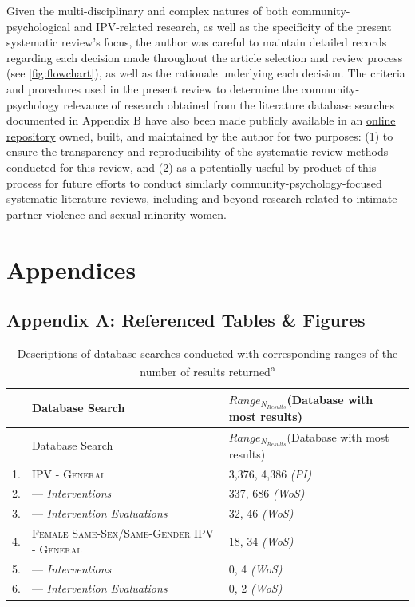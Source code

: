 \documentclass[11pt,]{tufte-book}
\begin{document}
Given the multi-disciplinary and complex natures of both
community-psychological and IPV-related research, as well as the
specificity of the present systematic review's focus, the author was
careful to maintain detailed records regarding each decision made
throughout the article selection and review process (see
\cref{fig:flowchart}), as well as the rationale
underlying each decision. The criteria and procedures used in the
present review to determine the community-psychology relevance of
research obtained from the literature database searches documented in
Appendix B have also been made publicly available in an
\href{https://eccriley.github.io/CommPsy-SysLitRvw/}{online repository}
owned, built, and maintained by the author for two purposes: (1) to
ensure the transparency and reproducibility of the systematic review
methods conducted for this review, and (2) as a potentially useful
by-product of this process for future efforts to conduct similarly
community-psychology-focused systematic literature reviews, including
and beyond research related to intimate partner violence and sexual
minority women.

\part{Appendices}

\singlespacing

\chapter{Appendix A: Referenced Tables \&
Figures}\label{appendix-a-referenced-tables-figures}

\begin{longtable}[]{@{}lll@{}}
\caption{Descriptions of database searches conducted with corresponding
ranges of the number of results returned\textsuperscript{a}
\label{tbl:dbsrch}}\tabularnewline
\toprule
& Database Search & \(Range_{N_{Results}}\)\newline(Database with most
results)\tabularnewline
\midrule
\endfirsthead
\toprule
& Database Search & \(Range_{N_{Results}}\)\newline(Database with most
results)\tabularnewline
\midrule
\endhead
1. & \textsc{IPV - General} & 3,376, 4,386
\textit{\footnotesize{(PI)}}\tabularnewline
2. & --- \textit{Interventions} & 337, 686
\textit{\footnotesize{(WoS)}}\tabularnewline
3. & --- \textit{Intervention Evaluations} & 32, 46
\textit{\footnotesize{(WoS)}}\tabularnewline
4. & \textsc{Female Same-Sex/Same-Gender IPV - General} & 18, 34
\textit{\footnotesize{(WoS)}}\tabularnewline
5. & --- \textit{Interventions} & 0, 4
\textit{\footnotesize{(WoS)}}\tabularnewline
6. & --- \textit{Intervention Evaluations} & 0, 2
\textit{\footnotesize{(WoS)}}\tabularnewline
\bottomrule
\end{longtable}
\end{document}
